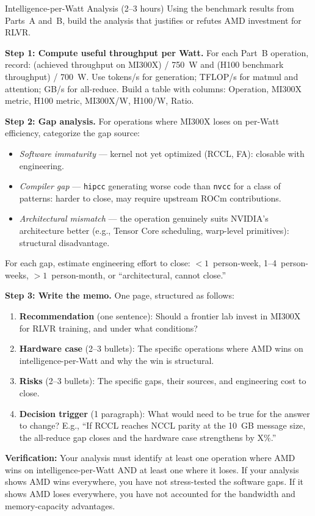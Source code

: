 \begin{exercise}{Intelligence-per-Watt Analysis (2--3 hours)}
Using the benchmark results from Parts~A and~B, build the analysis that justifies or refutes AMD investment for RLVR.

\textbf{Step 1: Compute useful throughput per Watt.} For each Part~B operation, record: (achieved throughput on MI300X) / 750~W and (H100 benchmark throughput) / 700~W. Use tokens/s for generation; TFLOP/s for matmul and attention; GB/s for all-reduce. Build a table with columns: Operation, MI300X metric, H100 metric, MI300X/W, H100/W, Ratio.

\textbf{Step 2: Gap analysis.} For operations where MI300X loses on per-Watt efficiency, categorize the gap source:
\begin{itemize}
  \item \textit{Software immaturity} --- kernel not yet optimized (RCCL, FA): closable with engineering.
  \item \textit{Compiler gap} --- \texttt{hipcc} generating worse code than \texttt{nvcc} for a class of patterns: harder to close, may require upstream ROCm contributions.
  \item \textit{Architectural mismatch} --- the operation genuinely suits NVIDIA's architecture better (e.g., Tensor Core scheduling, warp-level primitives): structural disadvantage.
\end{itemize}
For each gap, estimate engineering effort to close: $<1$~person-week, 1--4~person-weeks, $>1$~person-month, or ``architectural, cannot close.''

\textbf{Step 3: Write the memo.} One page, structured as follows:
\begin{enumerate}
  \item \textbf{Recommendation} (one sentence): Should a frontier lab invest in MI300X for RLVR training, and under what conditions?
  \item \textbf{Hardware case} (2--3 bullets): The specific operations where AMD wins on intelligence-per-Watt and why the win is structural.
  \item \textbf{Risks} (2--3 bullets): The specific gaps, their sources, and engineering cost to close.
  \item \textbf{Decision trigger} (1 paragraph): What would need to be true for the answer to change? E.g., ``If RCCL reaches NCCL parity at the 10~GB message size, the all-reduce gap closes and the hardware case strengthens by X\%.''
\end{enumerate}

\textbf{Verification:} Your analysis must identify at least one operation where AMD wins on intelligence-per-Watt AND at least one where it loses. If your analysis shows AMD wins everywhere, you have not stress-tested the software gaps. If it shows AMD loses everywhere, you have not accounted for the bandwidth and memory-capacity advantages.
\end{exercise}

